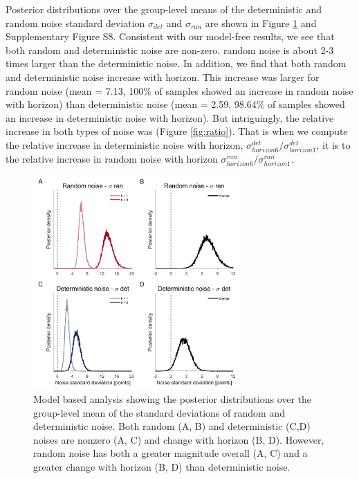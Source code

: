 \documentclass[12pt]{article}
\begin{document}
	Posterior distributions over the group-level means of the deterministic and random noise standard deviation $\sigma_{det}$ and $\sigma_{ran}$ are shown in Figure \ref{fig:mb1} and Supplementary Figure S8. Consistent with our model-free results, we see that both random and deterministic noise are non-zero.  random noise is about 2-3 times larger than the deterministic noise.  In addition, we find that both random and deterministic noise increase with horizon. This increase was larger for random noise (mean = 7.13, 100\% of samples showed an increase in random noise with horizon) than deterministic noise (mean = 2.59, 98.64\% of samples showed an increase in deterministic noise with horizon). But intriguingly, the relative increase in both types of noise was  (Figure \ref{fig:ratio}). That is when we compute the relative increase in deterministic noise with horizon, $\sigma^{det}_{horizon6}/\sigma^{det}_{horizon1}$, it is  to the relative increase in random noise with horizon $\sigma^{ran}_{horizon6}/\sigma^{ran}_{horizon1}$. 
	
	\begin{figure}[H]
		\begin{center}
			\includegraphics[width=0.7\textwidth]{figures/RDBayes_hyperprior.jpg}
			\caption{Model based analysis showing the posterior distributions over the group-level mean of the standard deviations of  random and deterministic noise. Both random (A, B) and deterministic (C,D) noises are nonzero (A, C) and change with horizon (B, D).  However, random noise has both a greater magnitude overall (A, C) and a greater change with horizon (B, D) than deterministic noise.}
			\label{fig:mb1}
		\end{center}
	\end{figure}
	
\end{document}
